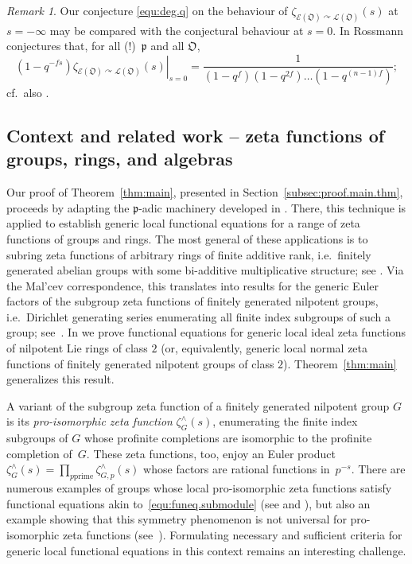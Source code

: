 \documentclass[11pt]{amsart}
\numberwithin{equation}{section}
\numberwithin{figure}{section}
\theoremstyle{plain}
\theoremstyle{definition}
\theoremstyle{remark}
\newtheorem{remark}[theorem]{Remark}
\begin{document}
\begin{remark}\label{rem:tobias.t=1}
  Our conjecture \eqref{equ:deg.q} on the behaviour of
  $\zeta_{{\mathcal{E}}({\mathfrak O}) {\curvearrowright} {\ensuremath{\mathcal{L}}}({\mathfrak O})}(s)$ at $s=-\infty$ may be
  compared with the conjectural behaviour at $s=0$. In
  \cite[Conjecture~IV (${\mathfrak{P}}$-adic form)]{Rossmann/15} Rossmann
  conjectures that, for all (!)~${\mathfrak{p}}$ and all ${\mathfrak O}$,
$$\left.(1-q^{-fs})\zeta_{{\mathcal{E}}({\mathfrak O}) {\curvearrowright} {\ensuremath{\mathcal{L}}}({\mathfrak O})}(s)\right|_{s=0} = \frac{1}{(1-q^f)(1-q^{2f})\dots(1-q^{(n-1)f})};$$
cf.\ also \cite[Section~8.3]{Rossmann/15}.
\end{remark}

\subsection{Context and related work -- zeta functions of groups, rings, and algebras}
Our proof of Theorem~\ref{thm:main}, presented in
Section~\ref{subsec:proof.main.thm}, proceeds by adapting the
${\mathfrak{p}}$-adic machinery developed in \cite{Voll/10}. There, this
technique is applied to establish generic local functional equations
for a range of zeta functions of groups and rings. The most general of
these applications is to subring zeta functions of arbitrary rings of
finite additive rank, i.e.\ finitely generated abelian groups with
some bi-additive multiplicative structure; see
\cite[Theorem~A]{Voll/10}.  Via the Mal'cev correspondence, this
translates into results for the generic Euler factors of the subgroup
zeta functions of finitely generated nilpotent groups, i.e.\ Dirichlet
generating series enumerating all finite index subgroups of such a
group; see~\cite[Corollary~1.1]{Voll/10}.  In
\cite[Theorem~C]{Voll/10} we prove functional equations for generic
local ideal zeta functions of nilpotent Lie rings of class $2$ (or,
equivalently, generic local normal zeta functions of finitely
generated nilpotent groups of class $2$). Theorem~\ref{thm:main}
generalizes this result.

A variant of the subgroup zeta function of a finitely generated
nilpotent group $G$ is its \emph{pro-isomorphic zeta function}
$\zeta^{\wedge}_G(s)$, enumerating the finite index subgroups of $G$
whose profinite completions are isomorphic to the profinite completion
of~$G$. These zeta functions, too, enjoy an Euler product
$\zeta^{\wedge}_G(s) = \prod_{p \textrm{
    prime}}\zeta^{\wedge}_{G,p}(s)$ whose factors are rational
functions in~$p^{-s}$. There are numerous examples of groups whose
local pro-isomorphic zeta functions satisfy functional equations akin
to~\eqref{equ:funeq.submodule} (see \cite{duSLubotzky/96, Berman/11}
and \cite{BermanKlopschOnn/15, BermanKlopschOnn/15a}), but also an
example showing that this symmetry phenomenon is not universal for
pro-isomorphic zeta functions
(see~\cite{BermanKlopsch/15}). Formulating necessary and sufficient
criteria for generic local functional equations in this context
remains an interesting challenge.
\end{document}
